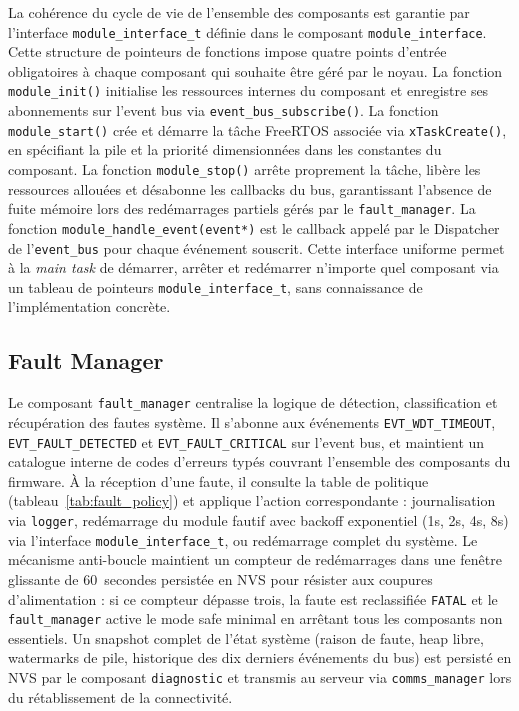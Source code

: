 La cohérence du cycle de vie de l'ensemble des composants est garantie
par l'interface \texttt{module\_interface\_t} définie dans le composant
\texttt{module\_interface}. Cette structure de pointeurs de fonctions
impose quatre points d'entrée obligatoires à chaque composant qui
souhaite être géré par le noyau. La fonction \texttt{module\_init()}
initialise les ressources internes du composant et enregistre ses
abonnements sur l'event bus via \texttt{event\_bus\_subscribe()}.
La fonction \texttt{module\_start()} crée et démarre la tâche FreeRTOS
associée via \texttt{xTaskCreate()}, en spécifiant la pile et la
priorité dimensionnées dans les constantes du composant. La fonction
\texttt{module\_stop()} arrête proprement la tâche, libère les
ressources allouées et désabonne les callbacks du bus, garantissant
l'absence de fuite mémoire lors des redémarrages partiels gérés par
le \texttt{fault\_manager}. La fonction \texttt{module\_handle\_event(event*)}
est le callback appelé par le Dispatcher de l'\texttt{event\_bus}
pour chaque événement souscrit. Cette interface uniforme permet à la
\textit{main task} de démarrer, arrêter et redémarrer n'importe quel
composant via un tableau de pointeurs \texttt{module\_interface\_t},
sans connaissance de l'implémentation concrète.

\subsection{Fault Manager}
\label{subsec:inter_modules}

Le composant \texttt{fault\_manager} centralise la logique de
détection, classification et récupération des fautes système. Il
s'abonne aux événements \texttt{EVT\_WDT\_TIMEOUT},
\texttt{EVT\_FAULT\_DETECTED} et \texttt{EVT\_FAULT\_CRITICAL} sur
l'event bus, et maintient un catalogue interne de codes d'erreurs
typés couvrant l'ensemble des composants du firmware. À la réception
d'une faute, il consulte la table de politique (tableau~\ref{tab:fault_policy})
et applique l'action correspondante : journalisation via \texttt{logger},
redémarrage du module fautif avec backoff exponentiel (1s, 2s, 4s, 8s)
via l'interface \texttt{module\_interface\_t}, ou redémarrage complet
du système. Le mécanisme anti-boucle maintient un compteur de
redémarrages dans une fenêtre glissante de 60~secondes persistée
en NVS pour résister aux coupures d'alimentation : si ce compteur
dépasse trois, la faute est reclassifiée \texttt{FATAL} et le
\texttt{fault\_manager} active le mode safe minimal en arrêtant
tous les composants non essentiels. Un snapshot complet de l'état
système (raison de faute, heap libre, watermarks de pile, historique
des dix derniers événements du bus) est persisté en NVS par le
composant \texttt{diagnostic} et transmis au serveur via
\texttt{comms\_manager} lors du rétablissement de la connectivité.

